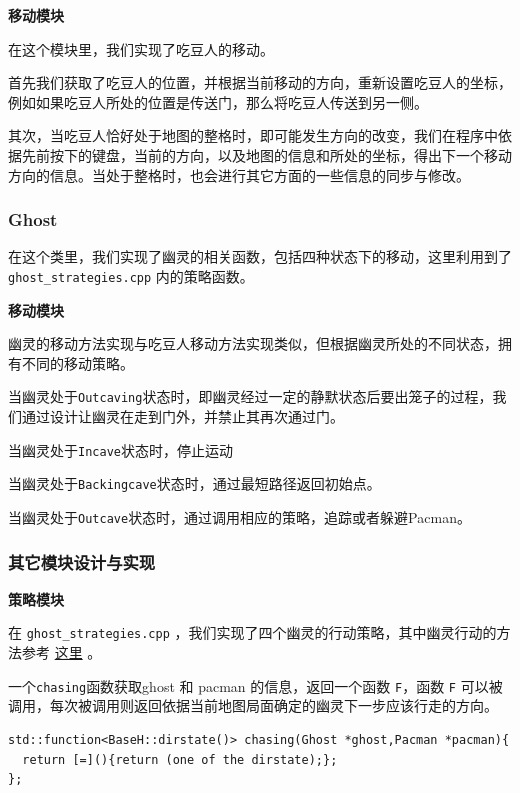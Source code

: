 \documentclass[UTF8,11pt]{ctexart}
\begin{document}
        \textbf{移动模块}
	    
        在这个模块里，我们实现了吃豆人的移动。
    
        首先我们获取了吃豆人的位置，并根据当前移动的方向，重新设置吃豆人的坐标，例如如果吃豆人所处的位置是传送门，那么将吃豆人传送到另一侧。
    
        其次，当吃豆人恰好处于地图的整格时，即可能发生方向的改变，我们在程序中依据先前按下的键盘，当前的方向，以及地图的信息和所处的坐标，得出下一个移动方向的信息。当处于整格时，也会进行其它方面的一些信息的同步与修改。

        \subsubsection{Ghost}
	    在这个类里，我们实现了幽灵的相关函数，包括四种状态下的移动，这里利用到了 \verb|ghost_strategies.cpp| 内的策略函数。
        
        \textbf{移动模块}
	    
        幽灵的移动方法实现与吃豆人移动方法实现类似，但根据幽灵所处的不同状态，拥有不同的移动策略。
    
        当幽灵处于\verb|Outcaving|状态时，即幽灵经过一定的静默状态后要出笼子的过程，我们通过设计让幽灵在走到门外，并禁止其再次通过门。
    
        当幽灵处于\verb|Incave|状态时，停止运动
    
        当幽灵处于\verb|Backingcave|状态时，通过最短路径返回初始点。
    
        当幽灵处于\verb|Outcave|状态时，通过调用相应的策略，追踪或者躲避Pacman。

        \subsubsection{其它模块设计与实现}
    
        \textbf{策略模块}
	
        在 \verb|ghost_strategies.cpp| ，我们实现了四个幽灵的行动策略，其中幽灵行动的方法参考 \href{https://www.mentalfloss.com/article/90874/your-pac-man-game-learning-different-strategies-each-ghost}{这里} 。
	
        一个\verb|chasing|函数获取ghost 和 pacman 的信息，返回一个函数 \verb|F|，函数 \verb|F| 可以被调用，每次被调用则返回依据当前地图局面确定的幽灵下一步应该行走的方向。
        \begin{lstlisting}
std::function<BaseH::dirstate()> chasing(Ghost *ghost,Pacman *pacman){
  return [=](){return (one of the dirstate);};
};            
        \end{lstlisting}
\end{document}
